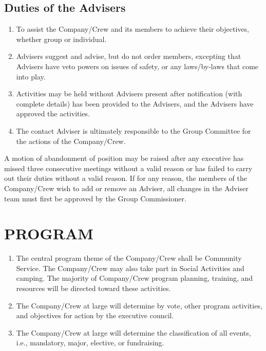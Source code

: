 \documentclass{Service_Corps_Document}
\begin{document}
\subsection{Duties of the Advisers}
\begin{enumerate}
	\item To assist the Company/Crew and its members to achieve their objectives, whether group or individual.
	\item Advisers suggest and advise, but do not order members, excepting that Advisers have veto powers on issues of safety, or any laws/by-laws that come into play.
	\item Activities may be held without Advisers present after notification (with complete details) has been provided to the Advisers, and the Advisers have approved the activities.
	\item The contact Adviser is ultimately responsible to the Group Committee for the actions of the Company/Crew. 
\end{enumerate}
A motion of abandonment of position may be raised after any executive has missed three consecutive meetings without a valid reason or has failed to carry out their duties without a valid reason.
If for any reason, the members of the Company/Crew wish to add or remove an Adviser, all changes in the Adviser team must first be approved by the Group Commissioner.
\section{PROGRAM}
\begin{enumerate}
	\item The central program theme of the Company/Crew shall be Community Service.
	The Company/Crew may also take part in Social Activities and camping.
	The majority of Company/Crew program planning, training, and resources will be directed toward these activities.
	\item The Company/Crew at large will determine by vote, other program activities, and objectives for action by the executive council.
	\item The Company/Crew at large will determine the classification of all events, i.e., mandatory, major, elective, or fundraising.
\end{enumerate}
\end{document}
